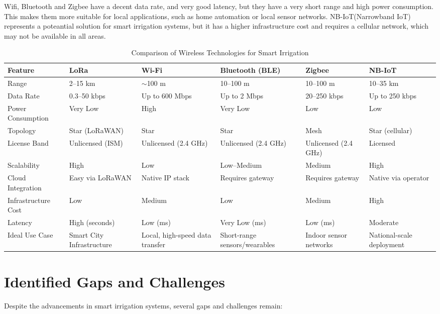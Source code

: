 Wifi, Bluetooth and Zigbee have a decent data rate, and very good latency, but they have a very short range 
and high power consumption. This makes them more suitable for local applications, 
such as home automation or local sensor networks. 
NB-IoT(Narrowband IoT) represents a poteantial solution for smart irrigation systems, but 
it has a higher infrastructure cost and requires a cellular network, which may not be available in all areas.

\begin{table}[ht]
\centering
\begin{tabular}{|p{3.2cm}|p{2.6cm}|p{2.6cm}|p{2.6cm}|p{2.6cm}|p{2.6cm}|}
\hline
\textbf{Feature} & \textbf{LoRa} & \textbf{Wi-Fi} & \textbf{Bluetooth (BLE)} & \textbf{Zigbee} & \textbf{NB-IoT} \\
\hline
Range & 2–15 km & $\sim$100 m & 10–100 m & 10–100 m & 10–35 km \\
\hline
Data Rate & 0.3–50 kbps & Up to 600 Mbps & Up to 2 Mbps & 20–250 kbps & Up to 250 kbps \\
\hline
Power Consumption & Very Low & High & Very Low & Low & Low \\
\hline
Topology & Star (LoRaWAN) & Star & Star & Mesh & Star (cellular) \\
\hline
License Band & Unlicensed (ISM) & Unlicensed (2.4 GHz) & Unlicensed (2.4 GHz) & Unlicensed (2.4 GHz) & Licensed \\
\hline
Scalability & High & Low & Low–Medium & Medium & High \\
\hline
Cloud Integration & Easy via LoRaWAN & Native IP stack & Requires gateway & Requires gateway & Native via operator \\
\hline
Infrastructure Cost & Low & Medium & Low & Medium & High \\
\hline
Latency & High (seconds) & Low (ms) & Very Low (ms) & Low (ms) & Moderate \\
\hline
Ideal Use Case & Smart City Infrastructure & Local, high-speed data transfer & Short-range sensors/wearables & Indoor sensor networks & National-scale deployment \\
\hline
\end{tabular}
\caption{Comparison of Wireless Technologies for Smart Irrigation}
\label{tab:wireless_comparison}
\end{table}


\section{Identified Gaps and Challenges}
Despite the advancements in smart irrigation systems, several gaps and challenges remain:

